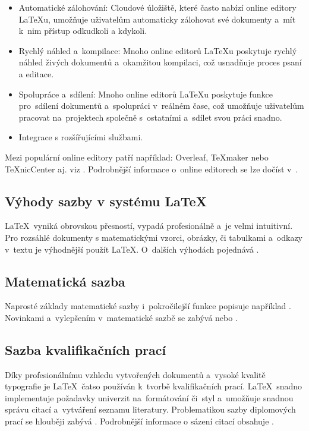 \documentclass[a4paper, 11pt]{article}
\begin{document}
\begin{itemize}
    \item Automatické zálohování: Cloudové úložiště, které často nabízí online editory LaTeXu, umožňuje uživatelům automaticky zálohovat své dokumenty a~mít k~nim přístup odkudkoli a kdykoli.
    \item Rychlý náhled a~kompilace: Mnoho online editorů LaTeXu poskytuje rychlý náhled živých dokumentů a~okamžitou kompilaci, což usnadňuje proces psaní a editace.
    \item Spolupráce a~sdílení: Mnoho online editorů LaTeXu poskytuje funkce pro~sdílení dokumentů a~spolupráci v~reálném čase, což umožňuje uživatelům pracovat na~projektech společně s~ostatními a~sdílet svou práci snadno.
    \item Integrace s rozšířujícími službami. 
\end{itemize}
Mezi populární online editory patří například: Overleaf, \TeX maker nebo \TeX nicCenter aj. viz \cite{Sokol2012}. Podrobnější informace o~online editorech se lze dočíst v~\cite{top_editors}.

\subsection{Výhody sazby v systému \LaTeX}
\LaTeX\ vyniká obrovskou přesností, vypadá profesionálně a~je velmi intuitivní. Pro rozsáhlé dokumenty s matematickými vzorci, obrázky, či tabulkami a~odkazy v~textu je výhodnější použít \LaTeX . O~dalších výhodách pojednává \cite{Latexove_speciality}.


\subsection{Matematická sazba}
Naprosté základy matematické sazby i~pokročilejší funkce popisuje například \cite{AMS1995}. Novinkami a~vylepšením v~matematické sazbě se zabývá \cite{IJITS2023} nebo \cite{CSTUG}.


\subsection{Sazba kvalifikačních prací}
Díky profesionálnímu vzhledu vytvořených dokumentů a~vysoké kvalitě typografie je \LaTeX\ čatso používán k~tvorbě kvalifikačních prací. \LaTeX\ snadno implementuje požadavky univerzit na~formátování či~styl a~umožňuje snadnou správu citací a~vytváření seznamu literatury. Problematikou sazby diplomových prací se hlouběji zabývá \cite{Bojko2011}.
Podrobnější informace o sázení citací obsahuje \cite{Gratzer2007}.

\newpage


\renewcommand{\refname}{Literatura}


 
\end{document}
